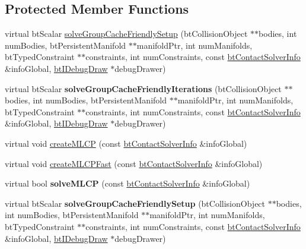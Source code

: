 \subsection*{Protected Member Functions}
\begin{DoxyCompactItemize}
\item 
virtual bt\+Scalar \hyperlink{classbtMLCPSolver_aa465e167537eceb89f7125d3bb2d5321}{solve\+Group\+Cache\+Friendly\+Setup} (bt\+Collision\+Object $\ast$$\ast$bodies, int num\+Bodies, bt\+Persistent\+Manifold $\ast$$\ast$manifold\+Ptr, int num\+Manifolds, bt\+Typed\+Constraint $\ast$$\ast$constraints, int num\+Constraints, const \hyperlink{structbtContactSolverInfo}{bt\+Contact\+Solver\+Info} \&info\+Global, \hyperlink{classbtIDebugDraw}{bt\+I\+Debug\+Draw} $\ast$debug\+Drawer)
\item 
\mbox{\label{classbtMLCPSolver_aba47abca0dc7f203f6ec5bc17d2f96a3}} 
virtual bt\+Scalar {\bfseries solve\+Group\+Cache\+Friendly\+Iterations} (bt\+Collision\+Object $\ast$$\ast$bodies, int num\+Bodies, bt\+Persistent\+Manifold $\ast$$\ast$manifold\+Ptr, int num\+Manifolds, bt\+Typed\+Constraint $\ast$$\ast$constraints, int num\+Constraints, const \hyperlink{structbtContactSolverInfo}{bt\+Contact\+Solver\+Info} \&info\+Global, \hyperlink{classbtIDebugDraw}{bt\+I\+Debug\+Draw} $\ast$debug\+Drawer)
\item 
virtual void \hyperlink{classbtMLCPSolver_a83c6bc90a6a311204fccec04aa331aee}{create\+M\+L\+CP} (const \hyperlink{structbtContactSolverInfo}{bt\+Contact\+Solver\+Info} \&info\+Global)
\item 
virtual void \hyperlink{classbtMLCPSolver_ab36b9b3bf2bbbd1de7db27ba109e0a8a}{create\+M\+L\+C\+P\+Fast} (const \hyperlink{structbtContactSolverInfo}{bt\+Contact\+Solver\+Info} \&info\+Global)
\item 
\mbox{\label{classbtMLCPSolver_a8b3955c50047184e0deb904242a66941}} 
virtual bool {\bfseries solve\+M\+L\+CP} (const \hyperlink{structbtContactSolverInfo}{bt\+Contact\+Solver\+Info} \&info\+Global)
\item 
\mbox{\label{classbtMLCPSolver_a739f48418e0c54040373cc258ee6595c}} 
virtual bt\+Scalar {\bfseries solve\+Group\+Cache\+Friendly\+Setup} (bt\+Collision\+Object $\ast$$\ast$bodies, int num\+Bodies, bt\+Persistent\+Manifold $\ast$$\ast$manifold\+Ptr, int num\+Manifolds, bt\+Typed\+Constraint $\ast$$\ast$constraints, int num\+Constraints, const \hyperlink{structbtContactSolverInfo}{bt\+Contact\+Solver\+Info} \&info\+Global, \hyperlink{classbtIDebugDraw}{bt\+I\+Debug\+Draw} $\ast$debug\+Drawer)
$$
\end{DoxyCompactItemize}
